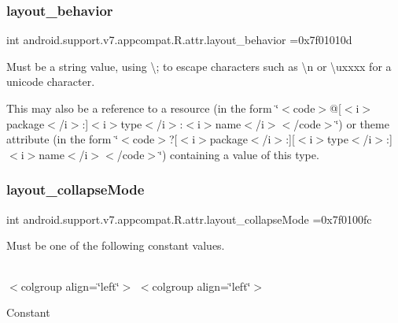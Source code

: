 \subsubsection{\texorpdfstring{layout\+\_\+behavior}{layout\_behavior}}
{\footnotesize\ttfamily int android.\+support.\+v7.\+appcompat.\+R.\+attr.\+layout\+\_\+behavior =0x7f01010d\hspace{0.3cm}{\ttfamily [static]}}

Must be a string value, using \textquotesingle{}\textbackslash{};\textquotesingle{} to escape characters such as \textquotesingle{}\textbackslash{}n\textquotesingle{} or \textquotesingle{}\textbackslash{}uxxxx\textquotesingle{} for a unicode character. 

This may also be a reference to a resource (in the form \char`\"{}$<$code$>$@\mbox{[}$<$i$>$package$<$/i$>$\+:\mbox{]}$<$i$>$type$<$/i$>$\+:$<$i$>$name$<$/i$>$$<$/code$>$\char`\"{}) or theme attribute (in the form \char`\"{}$<$code$>$?\mbox{[}$<$i$>$package$<$/i$>$\+:\mbox{]}\mbox{[}$<$i$>$type$<$/i$>$\+:\mbox{]}$<$i$>$name$<$/i$>$$<$/code$>$\char`\"{}) containing a value of this type. \mbox{\label{classandroid_1_1support_1_1v7_1_1appcompat_1_1R_1_1attr_aa20fa9883f29d3efd81f079d8a773820}} 
\subsubsection{\texorpdfstring{layout\+\_\+collapse\+Mode}{layout\_collapseMode}}
{\footnotesize\ttfamily int android.\+support.\+v7.\+appcompat.\+R.\+attr.\+layout\+\_\+collapse\+Mode =0x7f0100fc\hspace{0.3cm}{\ttfamily [static]}}

Must be one of the following constant values.

\tabulinesep=1mm
\begin{longtabu} spread 0pt [c]{*{0}{|X[-1]}|}
\hline
\end{longtabu}
$<$colgroup align=\char`\"{}left\char`\"{}$>$ $<$colgroup align=\char`\"{}left\char`\"{}$>$ 

Constant

